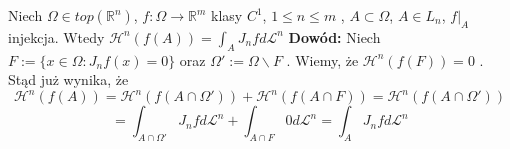 \begin{tw}
	Niech $\Omega \in top(\mathbb{R}^n)$, $f: \Omega \rightarrow \mathbb{R}^m$ klasy $C^1$, $1 \leq n \leq m$  , $A \subset \Omega$, $A \in L_n$, $f|_A$ injekcja. Wtedy $\mathcal{H}^n(f(A)) = \int_A J_nf d \mathcal{L}^n$  
	\newline
	\textbf{Dowód:}\newline
	Niech $F := \{x \in \Omega: J_nf(x) = 0\}$ oraz $\Omega' := \Omega \backslash F$ . Wiemy, że $\mathcal{H}^n(f(F)) = 0$ . Stąd już wynika, że 
	$$
		\mathcal{H}^n(f(A)) = \mathcal{H}^n(f(A \cap \Omega')) + \mathcal{H}^n(f(A \cap F)) = \mathcal{H}^n(f(A \cap \Omega')) 
	$$
	$$
		= \int_{A \cap \Omega'} J_nf d \mathcal{L}^n + \int_{A \cap F} 0 d \mathcal{L}^n = \int_{A} J_nf d \mathcal{L}^n
	$$ 
\end{tw}
